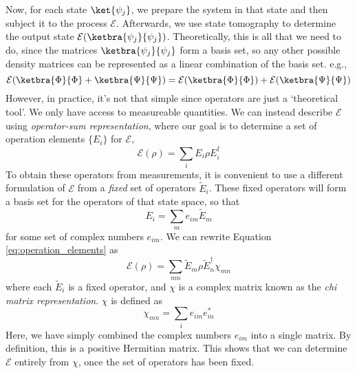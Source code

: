 Now, for each state $\ket{\psi_j}$, we prepare the system in that state and then subject it to the
process $\mathcal{E}$. Afterwards, we use state tomography to determine the output state
$\mathcal{E}(\ketbra{\psi_j}{\psi_j})$. Theoretically, this is all that we need to do, since the
matrices $\ketbra{\psi_j}{\psi_j}$ form a basis set, so any other possible density matrices can be
represented as a linear combination of the basis set. e.g.,
\begin{equation}
    \mathcal{E}(\ketbra{\Phi}{\Phi} + \ketbra{\Psi}{\Psi}) = 
    \mathcal{E}(\ketbra{\Phi}{\Phi}) + \mathcal{E}(\ketbra{\Psi}{\Psi})
\end{equation}
However, in practice, it's not that simple since operators are just a `theoretical tool'. We only
have access to measureable quantities. We can instead describe $\mathcal{E}$ using
\textit{operator-sum representation}, where our goal is to determine a set of operation elements
$\{E_i\}$ for $\mathcal{E}$,
\begin{equation} \label{eq:operation_elements}
    \mathcal{E}(\rho) = \sum_i E_i \rho E_i^{\dagger} 
\end{equation}
To obtain these operators from measurements, it is convenient to use a different formulation of
$\mathcal{E}$ from a \textit{fixed} set of operators $\tilde{E}_i$. These fixed operators will form
a basis set for the operators of that state space, so that
\begin{equation}
    E_i = \sum_m e_{im} \tilde{E}_m
\end{equation}
for some set of complex numbers $e_{im}$. We can rewrite Equation \ref{eq:operation_elements} as
\begin{equation} \label{eq:chi_matrix_representation}
    \mathcal{E}(\rho) = \sum_{mn} \tilde{E}_m \rho \tilde{E}_n^{\dagger} \chi_{mn}
\end{equation}
where each $\tilde{E}_i$ is a fixed operator, and $\chi$ is a complex matrix known as the
\textit{chi matrix representation}. $\chi$ is defined as
\begin{equation}
    \chi_{mn} = \sum_i e_{im} e_{in}^*
\end{equation}
Here, we have simply combined the complex numbers $e_{im}$ into a single matrix. By definition, this
is a positive Hermitian matrix. This shows that we can determine $\mathcal{E}$ entirely from $\chi$,
once the set of operators has been fixed. 

